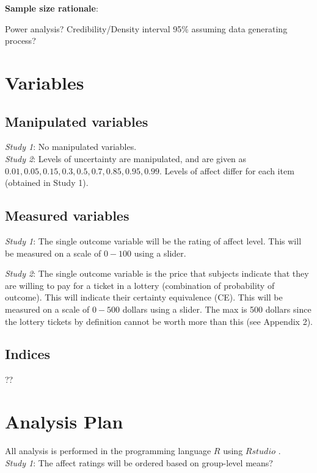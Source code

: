 \documentclass[12pt]{article}
\begin{document}
\textbf{Sample size rationale}:

Power analysis?
Credibility/Density interval 95\%
assuming data generating process?

\section{Variables}

\subsection{Manipulated variables}
\emph{Study 1}: No manipulated variables. \\

\emph{Study 2}: Levels of uncertainty are
manipulated, and are given as
$0.01, 0.05, 0.15, 0.3, 0.5, 0.7, 0.85, 0.95, 0.99$.
Levels of affect differ for each item
(obtained in Study 1).

\subsection{Measured variables}
\emph{Study 1}: The single outcome variable
will be the rating of affect level. This will
be measured on a scale of $0-100$ using a
slider.

\emph{Study 2}: The single outcome variable
is the price that subjects indicate that they
are willing to pay for a ticket in a lottery
(combination of probability of outcome).
This will indicate their certainty equivalence (CE).
This will be measured on a scale of $0-500$ dollars
using a slider. The max is 500 dollars since the
lottery tickets by definition cannot be worth
more than this (see Appendix 2).

\subsection{Indices}

??

\section{Analysis Plan}

All analysis is performed in the programming
language $R$ \autocite{rcore} using $Rstudio$
\autocite{rstudio}. \\

\emph{Study 1}: The affect ratings will be
ordered based on group-level means? \\
\end{document}
